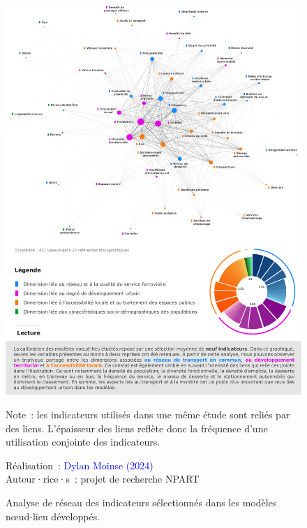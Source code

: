 \begin{refsegment}
    \begin{figure}[h!]\vspace*{4pt}
        \caption{Analyse de réseau des indicateurs sélectionnés dans les modèles nœud-lieu développés.}
        \label{fig-chap6:litterature-indicateurs}
        \centerline{\includegraphics[width=1\columnwidth]{src/Figures/Chap-6/FR_NPART_Litterature_indicateurs.pdf}}
        \vspace{5pt}
        \begin{flushleft}\scriptsize{
        Note~: les indicateurs utilisés dans une même étude sont reliés par des liens. L'épaisseur des liens reflète donc la fréquence d'une utilisation conjointe des indicateurs.
        }\end{flushleft}
        \begin{flushright}\scriptsize{
        Réalisation~: \textcolor{blue}{Dylan Moinse (2024)}
        \\
        Auteur·rice·s~: projet de recherche \acrshort{NPART}
        }\end{flushright}
    \end{figure}


\end{refsegment}
